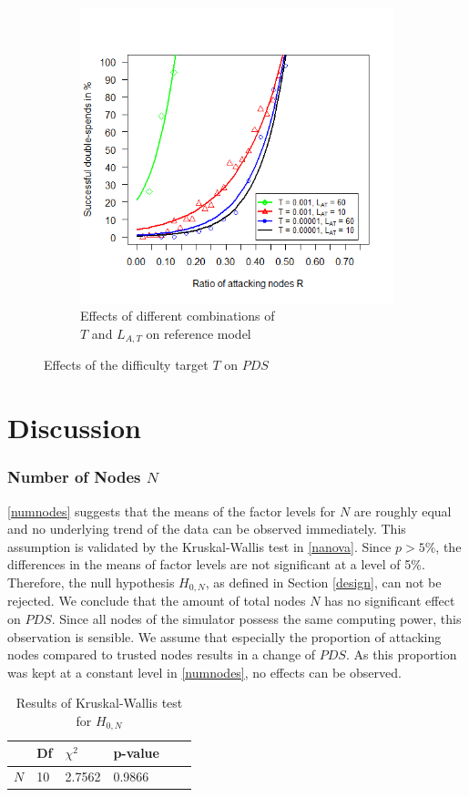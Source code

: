\documentclass[a4paper,12pt,twoside]{report}
\begin{document}
\begin{figure}[hb!]
\begin{subfigure}{.5\textwidth}
  \includegraphics[width=\linewidth]{Experiments/Difficulty/diffrat.png}
  \caption{Effects of different combinations of \\ $T$ and $L_{A,T}$ on reference model}
  \label{diff:b}
\end{subfigure}
\caption{Effects of the difficulty target $T$ on $PDS$}
\label{diff}
\end{figure}

\section{Discussion} \label{discussion}
\subsubsection{Number of Nodes $N$}
\autoref{numnodes} suggests that the means of the factor levels for $N$ are roughly equal and no underlying trend of the data can be observed immediately. This assumption is validated by the Kruskal-Wallis test in \autoref{nanova}. Since $p > 5\%$, the differences in the means of factor levels are not significant at a level of 5\%. Therefore, the null hypothesis $H_{0,N}$, as defined in Section \ref{design}, can not be rejected. We conclude that the amount of total nodes $N$ has no significant effect on $PDS$. Since all nodes of the simulator possess the same computing power, this observation is sensible. We assume that especially the proportion of attacking nodes compared to trusted nodes results in a change of $PDS$. As this proportion was kept at a constant level in \autoref{numnodes}, no effects can be observed.
\begin{table}[ht]
\centering
\begin{tabular}{|l|l|l|l|l|l|} \hline
& Df & $\chi^{2}$ & p-value \\ \hline
$N$ & 10 &  2.7562 & 0.9866 \\ \hline
\end{tabular}
\caption{Results of Kruskal-Wallis test for $H_{0,N}$}
\label{nanova}
\end{table}
\end{document}
